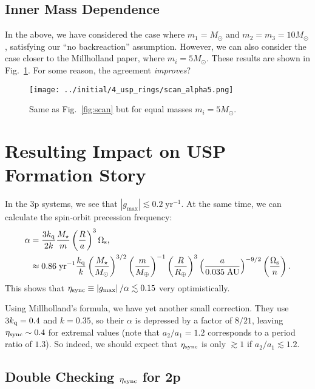 \documentclass[11pt,
        usenames, %
        dvipsnames %
    ]{article}
\newcommand*{\abs}[1]{\left|#1\right|}
\newcommand*{\p}[1]{\left(#1\right)}
\begin{document}
\subsection{Inner Mass Dependence}

In the above, we have considered the case where $m_1 = M_{\odot}$ and $m_2 = m_3
= 10M_{\odot}$, satisfying our ``no backreaction'' assumption. However, we can
also consider the case closer to the Millholland paper, where $m_i =
5M_{\odot}$. These results are shown in Fig.~\ref{fig:scan5}. For some reason,
the agreement \emph{improves}?
\begin{figure}
    \centering
    \texttt{[image: ../initial/4\_usp\_rings/scan\_alpha5.png]}
    \caption{Same as Fig.~\ref{fig:scan} but for equal masses $m_i =
    5M_{\odot}$.}\label{fig:scan5}
\end{figure}

\section{Resulting Impact on USP Formation Story}

In the 3p systems, we see that $\abs{g_{\max}} \lesssim 0.2 \;\mathrm{yr^{-1}}$.
At the same time, we can calculate the spin-orbit precession frequency:
\begin{align}
    \alpha &= \frac{3k_{\rm q}}{2k}\frac{M_\star}{m}
        \p{\frac{R}{a}}^3 \Omega_{\rm s},\\
        &\approx 0.86\;\mathrm{yr^{-1}}
            \frac{k_{\rm q}}{k}
            \p{\frac{M_{\star}}{M_{\odot}}}^{3/2}
            \p{\frac{m}{M_{\oplus}}}^{-1}
            \p{\frac{R}{R_{\oplus}}}^3
            \p{\frac{a}{0.035\;\mathrm{AU}}}^{-9/2}
            \p{\frac{\Omega_{\rm s}}{n}}.
\end{align}
This shows that $\eta_{\rm sync} \equiv \abs{g_{\max}} / \alpha \lesssim 0.15$
very optimistically.

Using Millholland's formula, we have yet another small correction. They use
$3k_{\rm q} = 0.4$ and $k = 0.35$, so their $\alpha$ is depressed by a factor of
$8/21$, leaving $\eta_{\rm sync} \sim 0.4$ for extremal values (note that $a_2 /
a_1 = 1.2$ corresponds to a period ratio of $1.3$). So indeed, we should expect
that $\eta_{\rm sync}$ is only $\gtrsim 1$ if $a_2 / a_1 \lesssim 1.2$.

\subsection{Double Checking $\eta_{\rm sync}$ for 2p}
\end{document}
